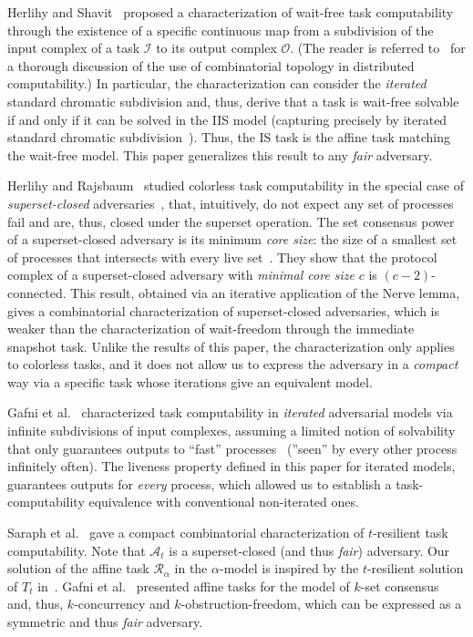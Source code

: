 \documentclass[a4paper]{article}
\def\A{\ensuremath{\mathcal{A}}}
\def\R{\ensuremath{\mathcal{R}}}
\def\I{\ensuremath{\mathcal{I}}}
\def\O{\ensuremath{\mathcal{O}}}
\def\fair{\textit{fair}}
\def\O {\mathcal{O}}
\def\I {\mathcal{I}}
\begin{document}
Herlihy and Shavit~\cite{HS99} proposed a 
characterization of wait-free task computability through the
existence of a specific continuous map from a subdivision 
of the input complex of a task $\I$ to its output complex $\O$.
(The reader is referred to~\cite{HKR14} for a thorough discussion of the use of combinatorial topology 
in distributed computability.)
In particular, the characterization can consider the \emph{iterated} standard
chromatic subdivision and, thus, derive that a task is wait-free
solvable if and only if it can be solved in the IIS model
(capturing precisely by iterated standard chromatic subdivision~\cite{Koz12}).
Thus, the IS task is the affine task matching the wait-free model.
This paper generalizes this result to any {\fair} adversary. 

Herlihy and Rajsbaum~\cite{HR12}
studied colorless task computability
in the special case of \emph{superset-closed} adversaries~\cite{Kuz12},
that, intuitively, do not expect any set of processes 
fail and are, thus, closed under the superset operation.
The set consensus power of a superset-closed adversary is its minimum \emph{core size}:
the size of a smallest set of processes that intersects with
every live set~\cite{JM07-cores}.
%
They show that the protocol complex of a superset-closed adversary with 
\emph{minimal core size} $c$ is $(c-2)$-connected.
This result, obtained via an iterative application of the Nerve lemma, gives
a combinatorial characterization of superset-closed adversaries, which
is weaker than the characterization of wait-freedom through
the immediate snapshot task.
%
Unlike the results of this paper, the characterization only applies to colorless tasks, and it does not allow us to express the
adversary in a \emph{compact} way via a specific task whose iterations
give an equivalent model.  

Gafni et al.~\cite{GKM14-podc} characterized task computability in
\emph{iterated} adversarial models via infinite subdivisions of input
complexes, assuming a limited notion of solvability
that only guarantees outputs to ``fast'' processes~\cite{Gaf98,RS12,BGK14} (''seen'' by every other
process infinitely often).
%
The liveness property defined in this
paper for iterated models, guarantees outputs for \emph{every}
process, which allowed us to establish a task-computability equivalence with 
conventional non-iterated ones. 

Saraph et al.~\cite{SHG16} gave a compact combinatorial
characterization of $t$-resilient  task computability.
Note that $\A_t$ is a superset-closed (and thus {\fair}) adversary.
Our solution of the affine task  $\R_{\alpha}$ in the $\alpha$-model
is inspired by the $t$-resilient solution of $T_t$ in~\cite{SHG16}.   
%
Gafni et al.~\cite{GHKR16} presented affine tasks for the model of $k$-set consensus and, thus,
$k$-concurrency and $k$-obstruction-freedom, which can be expressed as
a symmetric and thus {\fair} adversary.
%
\end{document}
